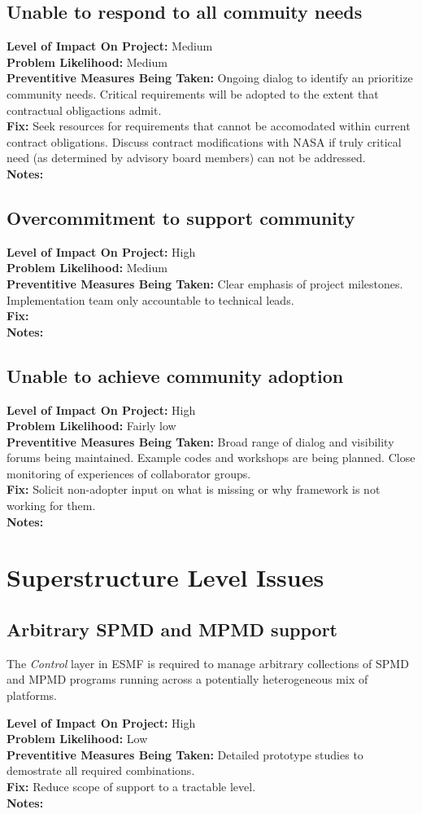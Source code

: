 \documentclass[english]{article}
\newcommand{\req}[1]{\section{\hspace{.2in}#1}}
\newcommand{\sreq}[1]{\subsection{\hspace{.2in}#1}}
\newenvironment
{reqlist}
{\begin{list} {} {} \rm \item[]}
{\end{list}}
\begin{document}
\sreq{Unable to respond to all commuity needs}
\begin{reqlist}
{\bf Level of Impact On Project:}  Medium \\
{\bf Problem Likelihood:} Medium \\
{\bf Preventitive Measures Being Taken:} Ongoing dialog to identify an prioritize
community needs. Critical requirements will be adopted to the extent
that contractual obligactions admit.\\
{\bf Fix:} Seek resources for requirements that cannot be accomodated within current
contract obligations. Discuss contract modifications with NASA if truly critical
need (as determined by advisory board members) can not be addressed. \\
{\bf Notes:} \\
\end{reqlist}

\sreq{Overcommitment to support community}
\begin{reqlist}
{\bf Level of Impact On Project:} High \\
{\bf Problem Likelihood:} Medium \\
{\bf Preventitive Measures Being Taken:} Clear emphasis of project milestones. Implementation
team only accountable to technical leads.\\
{\bf Fix:} \\
{\bf Notes:} \\
\end{reqlist}

\sreq{Unable to achieve community adoption}
\begin{reqlist}
{\bf Level of Impact On Project:}  High \\
{\bf Problem Likelihood:} Fairly low \\
{\bf Preventitive Measures Being Taken:} Broad range of dialog and visibility 
forums being maintained. Example codes and workshops are being planned.
Close monitoring of experiences of collaborator groups.
\\
{\bf Fix:} Solicit non-adopter input on what is missing or why framework is not working for them.\\
{\bf Notes:} \\
\end{reqlist}

\req{Superstructure Level Issues}
\sreq{Arbitrary SPMD and MPMD support}
The {\it Control} layer in ESMF is required to manage arbitrary collections
of SPMD and MPMD programs running across a potentially heterogeneous
mix of platforms.
\begin{reqlist}
{\bf Level of Impact On Project:} High \\
{\bf Problem Likelihood:} Low \\
{\bf Preventitive Measures Being Taken:} Detailed prototype studies to demostrate all required
combinations.\\
{\bf Fix:} Reduce scope of support to a tractable level.\\
{\bf Notes:}
\end{reqlist}
\end{document}
